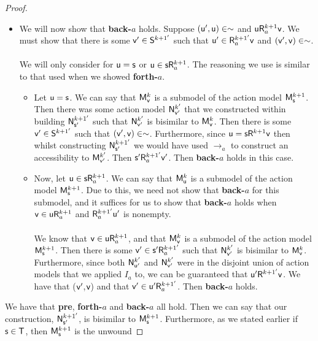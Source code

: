 \begin{proof}
\begin{itemize}
	\item We will now show that {\bf back-$a$} holds.
	Suppose $(\evu',\evu) \in \sim$ and $\evu \evR^{k+1}_a \evv$.
	We must show that there is some $\evv' \in \evS^{k+1'}$ such that $\evu' \in \evR^{k+1'}_a \evv$ and
	$(\evv',\evv) \in \sim$.\\
	\\
	We will only consider for $\evu = \evs$ or $\evu \in \evs \evR^{k+1}_a$.
	The reasoning we use is similar to that used when we showed {\bf forth-$a$}.
	\begin{itemize}
		\item Let $\evu = \evs$.
	We can say that $\evMM^{k}_\evv$ is a submodel of the action model $\evMM^{k+1}_\evs$.
	Then there was some action model $\evM^{k'}_{\evv'}$ that we constructed within building
	$\evM^{k+1'}_{\evs'}$ such that $\evM^{k'}_{\evv'}$ is bisimilar to $\evMM^k_\evv$.
	Then there is some $\evv' \in \evS^{k+1'}$ such that $(\evv',\evv) \in \sim$.
	Furthermore, since $\evu = \evs \evR^{k+1} \evv$ then whilst constructing $\evM^{k+1'}_{\evs'}$ we would
	have used $\to_a$ to construct an	accessibility to $\evMM^{k'}_{\evv'}$.
	Then $\evs' \evR^{k+1'}_a \evv'$.
	Then {\bf back-$a$} holds in this case.
		\item Now, let $\evu \in \evs \evR^{k+1}_a$.
	We can say that $\evMM^{k}_\evu$ is a submodel of the action model $\evMM^{k+1}_\evs$.
	Due to this, we need not show that {\bf back-$a$} for this submodel, and it suffices for us to
	show that {\bf back-$a$} holds when $\evv \in \evu \evR^{k+1}_a$ and $\evR^{k+1'}_a \evu'$ is
	nonempty.\\
	\\
	We know that $\evv \in \evu \evR^{k+1}_a$, and that $\evMM^{k}_\evv$ is a submodel of
	the action model $\evMM^{k+1}_\evs$.
	Then there is some $\evv' \in \evs' \evR^{k+1'}_a$ such that $\evM^{k'}_{\evv'}$ is bisimilar to
	$\evMM^{k}_\evv$.
	Furthermore, since both $\evM^{k'}_{\evu'}$ and $\evM^{k'}_{\evv'}$ were in the disjoint union of action models
	that we applied $I_a$ to, we can be guaranteed that $\evu' \evR^{k+1'} \evv$.
	We have that ($\evv'$,$\evv$) and that $\evv' \in \evu' \evR^{k+1'}_a$.
	Then {\bf back-$a$} holds.
	\end{itemize}
	\end{itemize}
	We have that {\bf pre}, {\bf forth-$a$} and {\bf back-$a$} all hold.
	Then we can say that our construction, $\evM^{k+1'}_{\evs'}$, is bisimilar to $\evMM^{k+1}_\evs$.
	Furthermore, as we stated earlier if $\evs \in \evT$, then $\evMM^{k+1}_\evs$ is the unwound

\end{proof}
